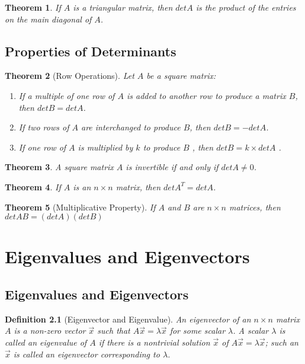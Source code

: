 \documentclass[oneside]{report}
\newtheorem{theorem}{Theorem}[section]
\newtheorem{definition}{Definition}[section]
\begin{document}
\begin{theorem}
  If $A$ is a triangular matrix, then $det A$ is the product of the entries on the main
diagonal of $A$.
\end{theorem}

\section{Properties of Determinants}
  \begin{theorem}[Row Operations]
    Let $A$ be a square matrix:
    \begin{enumerate}
      \item If a multiple of one row of $A$ is added to another row to produce a matrix $B$,
then $det B = det A$.
      \item If two rows of $A$ are interchanged to produce $B$, then $det B = - det A$.
      \item If one row of $A$ is multiplied by $k$ to produce $B$ , then $det B = k \times det A$ .
    \end{enumerate}
  \end{theorem}

  \begin{theorem}
    A square matrix $A$ is invertible if and only if $det A \neq 0$.
  \end{theorem}

  \begin{theorem}
    If $A$ is an $n\times n$ matrix, then $det A^T = det A$.
  \end{theorem}

  \begin{theorem}[Multiplicative Property]
    If $A$ and $B$ are $n\times n$ matrices, then $det AB = (det A)(det B)$
  \end{theorem}

  \chapter{Eigenvalues and Eigenvectors}

  \section{Eigenvalues and Eigenvectors}

  \begin{definition}[Eigenvector and Eigenvalue]
    An eigenvector of an $n\times n$ matrix $A$ is a non-zero vector $\vec{x}$ such that $A\vec{x}=\lambda\vec{x}$ for some scalar $\lambda$. A scalar $\lambda$ is called an eigenvalue of $A$ if there is a nontrivial solution $\vec{x}$ of $A\vec{x}=\lambda\vec{x}$; such an $\vec{x}$ is called an eigenvector corresponding to $\lambda$.
  \end{definition}
\end{document}
